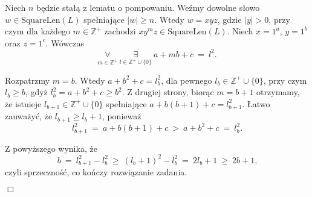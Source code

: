 \documentclass[12pt]{article}
\begin{document}
	\medskip
	
	Niech \(n\) będzie stałą z lematu o pompowaniu. Weźmy dowolne słowo \(w \in
	\text{SquareLen}(L)\) spełniające \(|w| \geqslant n\). Wtedy \(w = xyz\),
	gdzie \(|y| > 0\), przy czym dla każdego \(m \in \mathbb{Z}^{+}\) zachodzi
	\(xy^{m}z \in \text{SquareLen}(L)\). Niech \(x = 1^{a}\), \(y = 1^{b}\) oraz
	\(z = 1^{c}\). Wówczas
	\[ \underset{m \in \mathbb{Z}^{+}}{\forall} \ \underset{l \in
	\mathbb{Z}^{+} \cup \{0\}}{\exists} \ a + mb + c \ = \ l^2 \text{.} \]
	
	\medskip
	
	Rozpatrzmy \(m = b\). Wtedy \(a + b^{2} + c = l_{b}^2\), dla pewnego
	\(l_{b} \in \mathbb{Z}^{+} \cup \{0\}\), przy czym \(l_{b} \geqslant b\),
	gdyż \(l_{b}^{2} = a + b^{2} + c \geqslant b^{2}\). Z drugiej strony, biorąc
	\(m = b + 1\) otrzymamy, że istnieje \(l_{b + 1} \in \mathbb{Z}^{+} \cup
	\{0\}\) spełniające \(a + b(b + 1) + c = l_{b + 1}^{2}\). Łatwo zauważyć, że
	\(l_{b + 1} \geqslant l_{b} + 1\), ponieważ
	\[ l_{b + 1}^{2} \ = \ a + b(b + 1) + c \ > \ a + b^{2} + c \ = \
	l_{b}^{2} \text{.} \]
	
	\medskip
	
	Z powyższego wynika, że
	\[ b \ = \ l_{b + 1}^{2} - l_{b}^{2} \ \geqslant \ \left( l_{b} + 1 \right)
	^ {2} - l_{b}^{2} \ = \ 2l_{b} + 1 \ \geqslant \ 2b + 1 \text{,} \]
	czyli sprzeczność, co kończy rozwiązanie zadania.
	\begin{flushright}
		\(\Box\)
	\end{flushright}
\end{document}
